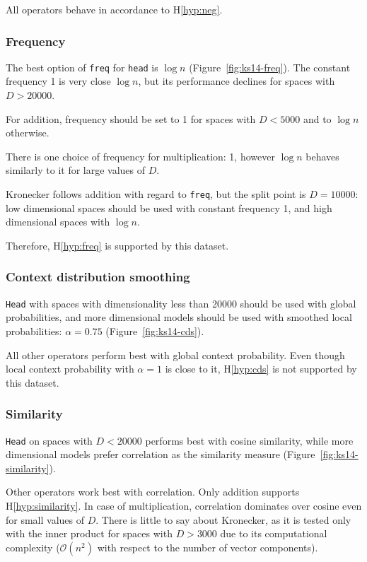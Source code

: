 All operators behave in accordance to H\ref{hyp:neg}.

\subsubsection{Frequency}
The best option of \texttt{freq} for \texttt{head} is $\log n$ (Figure~\ref{fig:ks14-freq}). The constant frequency 1 is very close $\log n$, but its performance declines for spaces with $D > 20000$.

For addition, frequency should be set to 1 for spaces with $D < 5000$ and to $\log n$ otherwise.

There is one choice of frequency for multiplication: 1, however $\log n$ behaves similarly to it for large values of $D$.

Kronecker follows addition with regard to \texttt{freq}, but the split point is $D = 10000$: low dimensional spaces should be used with constant frequency 1, and high dimensional spaces with $\log n$.

Therefore, H\ref{hyp:freq} is supported by this dataset.

\subsubsection{Context distribution smoothing}


\texttt{Head} with spaces with dimensionality less than 20000 should be used with global probabilities, and more dimensional models should be used with smoothed local probabilities: $\alpha = 0.75$ (Figure~\ref{fig:ks14-cds}).

All other operators perform best with global context probability. Even though local context probability with $\alpha = 1$ is close to it, H\ref{hyp:cds} is not supported by this dataset.

\subsubsection{Similarity}
\texttt{Head} on spaces with $D < 20000$ performs best with cosine similarity, while more dimensional models prefer correlation as the similarity measure (Figure~\ref{fig:ks14-similarity}).

Other operators work best with correlation. Only addition supports H\ref{hyp:similarity}. In case of multiplication, correlation dominates over cosine even for small values of $D$. There is little to say about Kronecker, as it is tested only with the inner product for spaces with $D > 3000$ due to its computational complexity ($\mathcal{O}(n^2)$ with respect to the number of vector components).

